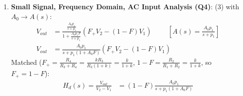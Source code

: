 \begin{enumerate}
    \begin{align*}
      a &= \frac{k R_3 (R_1 + k R_1)}{R_1 (R_3 + k R_3)} = \frac{k R_1 R_3 (1 + k)}{R_1 R_3 (1 + k)} = k = b \\
      V_{OUT} &= k (V_2 - V_1) = \frac{R_2}{R_1}(V_2 - V_1) \tag{4}
    \end{align*}
    valid while \(V_{OL} \leq V_{OUT} \leq V_{OH}\) and \(V_+ = F_+ V_2\) is inside the input common mode range.
  \item \textbf{Small Signal, Frequency Domain, AC Input Analysis (Q4)}: (3) with
    \(A_0 \to A(s)\):
    \begin{align*}
      V_{out} &= \frac{\frac{A_0 p_1}{s + p_1}}{1 + \frac{A_0 p_1 F}{s + p_1}}\left(F_+ V_2 - (1 - F) V_1\right) \hspace{1cm} \left[A(s) = \tfrac{A_0 p_1}{s + p_1}\right] \\
      V_{out} &= \frac{A_0 p_1}{s + p_1(1 + A_0 F)}\left(F_+ V_2 - (1 - F) V_1\right) \tag{5}
    \end{align*}
    Matched (\(F_+ = \frac{R_4}{R_3 + R_4} = \frac{k R_3}{R_3(1 + k)} = \frac{k}{1 + k}\),
    \(1 - F = \frac{R_2}{R_1 + R_2} = \frac{k}{1 + k}\), so \(F_+ = 1 - F\)):
    \begin{align*}
      H_d(s) = \frac{V_{out}}{V_2 - V_1} &= (1 - F)\frac{A_0 p_1}{s + p_1(1 + A_0 F)} \tag{6}
    \end{align*}
\end{enumerate}

